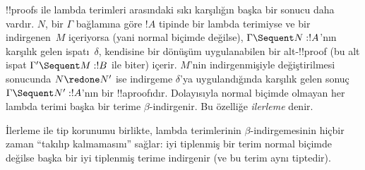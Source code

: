 \documentclass[../../../include/open-logic-section]{subfiles}
\begin{document}
!!{proof}s ile lambda terimleri arasındaki sıkı karşılığın başka bir sonucu
daha vardır. $N$, bir $\Gamma$ bağlamına göre $!A$ tipinde bir lambda
terimiyse ve bir indirgenen~$M$ içeriyorsa (yani normal biçimde değilse),
$\Gamma \Sequent N : !A$'nın karşılık gelen 
ispatı~$\delta$, kendisine bir dönüşüm uygulanabilen bir alt-!!{proof}
(bu alt ispat $\Gamma' \Sequent M: !B$ ile biter) içerir. $M$'nin
indirgenmişiyle değiştirilmesi sonucunda $N \redone N'$ ise indirgeme
$\delta$'ya uygulandığında karşılık gelen sonuç $\Gamma \Sequent N' : !A$'nın
bir !!a{proof}{}ıdır. Dolayısıyla normal biçimde olmayan her lambda terimi
başka bir terime $\beta$-indirgenir. Bu özelliğe \emph{ilerleme} denir.

İlerleme ile tip korunumu birlikte, lambda terimlerinin $\beta$-indirgemesinin
hiçbir zaman ``takılıp kalmamasını'' sağlar: iyi tiplenmiş bir terim normal
biçimde değilse başka bir iyi tiplenmiş terime indirgenir (ve bu terim aynı
tiptedir).
\end{document}
